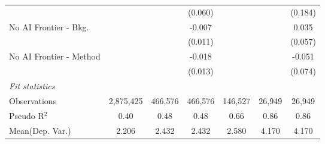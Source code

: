 \begin{tabular}{lcccccc}
                           &           &         & (0.060)       &               &                & (0.184)\\   
   No AI Frontier - Bkg.   &           &         & -0.007        &               &                & 0.035\\   
                           &           &         & (0.011)       &               &                & (0.057)\\   
   No AI Frontier - Method &           &         & -0.018        &               &                & -0.051\\   
                           &           &         & (0.013)       &               &                & (0.074)\\   
   \midrule
   \emph{Fit statistics}\\
   Observations            & 2,875,425 & 466,576 & 466,576       & 146,527       & 26,949         & 26,949\\  
   Pseudo R$^2$            & 0.40      & 0.48    & 0.48          & 0.66          & 0.86           & 0.86\\  
Mean(Dep. Var.) & 2.206 & 2.432 & 2.432 & 2.580 & 4.170 & 4.170 \\
   

\end{tabular}
